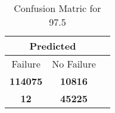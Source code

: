 \begin{table}[] 
\caption{Confusion Matric for 97.5} 
\label{Table: Prediction Accuracy-DMD97.5OnlySunEKF-resetReflectionEKF-top2-Reflection} 
\centering 
\begin{tabular} 
 {@{}ccc@{}} 
\toprule 
\multicolumn{2}{c}{\textbf{Predicted}}
 \\ \midrule 
\multicolumn{1}{|c|}{Failure} & 
\multicolumn{1}{c|}{No Failure}
 \\ \midrule 
\multicolumn{1}{|c|}{\color{green}\textbf{114075}} & 
\multicolumn{1}{c|}{\color{red}\textbf{10816}}
 \\ \midrule 
\multicolumn{1}{|c|}{\color{red}\textbf{12}} & 
\multicolumn{1}{c|}{\color{green}\textbf{45225}}
 \\ \bottomrule 
\end{tabular} 
\end{table} 
